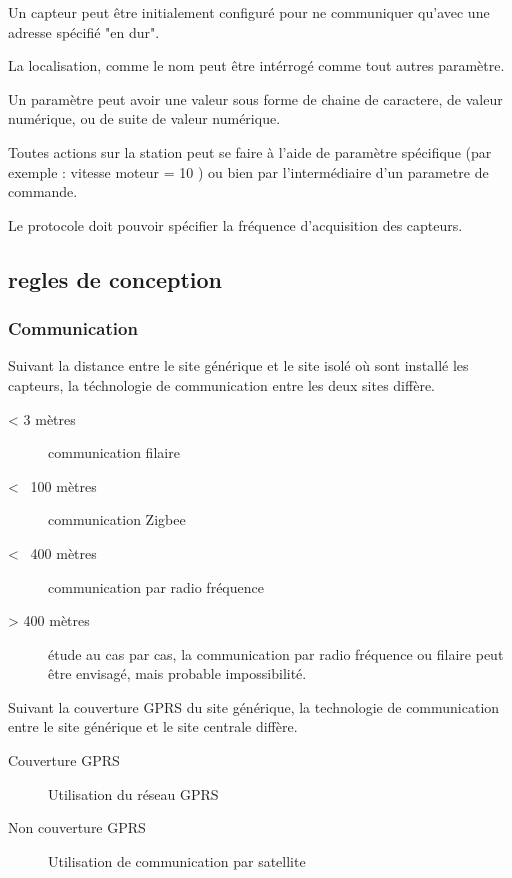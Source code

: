         Un capteur peut être initialement configuré pour ne communiquer qu'avec une adresse spécifié "en dur".

        La localisation, comme le nom peut être intérrogé comme tout autres paramètre.

        Un paramètre peut avoir une valeur sous forme de chaine de caractere, de valeur numérique, ou de suite de valeur numérique.


        Toutes actions sur la station peut se faire à l'aide de paramètre spécifique (par exemple : vitesse moteur = 10 )
        ou bien par l'intermédiaire d'un parametre de commande.

        Le protocole doit pouvoir spécifier la fréquence d'acquisition des capteurs.

        


    \subsection{regles de conception}
        
        \subsubsection{Communication}
        
            Suivant la distance entre le site générique et le site isolé où sont installé les capteurs, la téchnologie de communication entre les deux sites diffère.
            \begin{description}
                \item[< 3 mètres] communication filaire
                \item[< ~100 mètres] communication Zigbee
                \item[< ~400 mètres] communication par radio fréquence
                \item[> 400 mètres] étude au cas par cas, la communication par radio fréquence ou filaire peut être envisagé, mais probable impossibilité.
            \end{description}
            
            Suivant la couverture GPRS du site générique, la technologie de communication entre le site générique et le site centrale diffère.
            \begin{description}
                \item[Couverture GPRS] Utilisation du réseau GPRS
                \item[Non couverture GPRS] Utilisation de communication par satellite
            \end{description}
            
